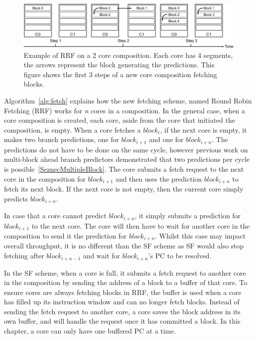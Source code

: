 \begin{figure}[t]
    \centering
    \includegraphics[width=1\textwidth]{chapter3/graphics/fetching-model.pdf}

    \caption{Example of RRF on a 2 core composition. Each core has 4 segments, the arrows represent the block generating the predictions. This figure shows the first 3 steps of a new core composition fetching blocks.}
    \label{fig:new_fetch_ex}
\vspace{1em}
	\end{figure}
Algorithm~\ref{alg:fetch} explains how the new fetching scheme, named Round Robin Fetching (RRF) works for \textit{n} cores in a composition.
In the general case, when a core composition is created, each core, aside from the core that initiated the composition, is empty.
When a core fetches a $block_i$, if the next core is empty, it makes two branch predictions, one for $block_{i+1}$ and one for $block_{i+n}$.
The predictions do not have to be done on the same cycle, however previous work on multi-block ahead branch predictors demonstrated that two predictions per cycle is possible~\ref{SeznecMultipleBlock}.
The core submits a fetch request to the next core in the composition for $block_{i+1}$ and then uses the prediction $block_{i+n}$ to fetch its next block.
If the next core is not empty, then the current core simply predicts $block_{i+n}$.

In case that a core cannot predict $block_{i+n}$, it simply submits a prediction for $block_{i+1}$ to the next core.
The core will then have to wait for another core in the composition to send it the prediction for $block_{i+n}$.
Whilst this case may impact overall throughput, it is no different than the SF scheme as SF would also stop fetching after $block_{i+n-1}$ and wait for $block_{i+n}$'s PC to be resolved.

In the SF scheme, when a core is full, it submits a fetch request to another core in the composition by sending the address of a block to a buffer of that core.
To ensure cores are always fetching blocks in RRF, the buffer is used when a core has filled up its instruction window and can no longer fetch blocks.
Instead of sending the fetch request to another core, a core saves the block address in its own buffer, and will handle the request once it has committed a block.
In this chapter, a core can only have one buffered PC at a time.

